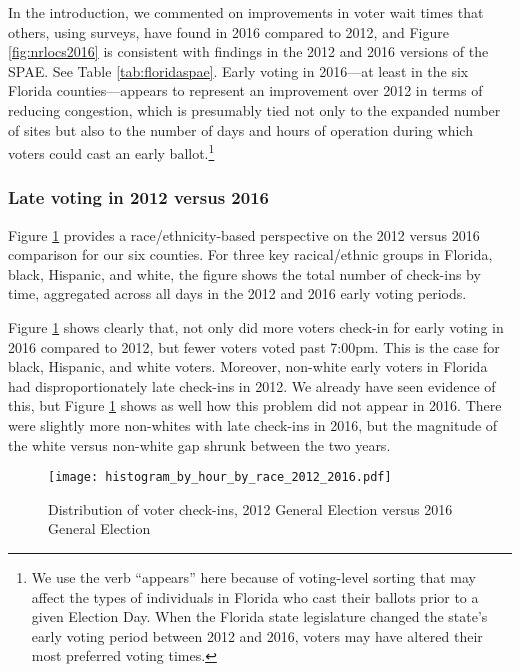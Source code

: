\documentclass[12pt,titlepage]{article}
\begin{document}
In the introduction, we commented on improvements in voter wait times
that others, using surveys, have found in 2016 compared to 2012, and
Figure \ref{fig:nrlocs2016} is consistent with findings in the 2012
\citep{spae2012} and 2016 \citep{spae2016} versions of the SPAE.  See
Table \ref{tab:floridaspae}.  Early voting in 2016---at least in the
six Florida counties---appears to represent an improvement over 2012
in terms of reducing congestion, which is presumably tied not only to
the expanded number of sites but also to the number of days and hours
of operation during which voters could cast an early
ballot.\footnote{We use the verb ``appears'' here because of
  voting-level sorting that may affect the types of individuals in
  Florida who cast their ballots prior to a given Election Day.  When
  the Florida state legislature changed the state's early voting
  period between 2012 and 2016, voters may have altered their most
  preferred voting times.}



\subsubsection*{Late voting in 2012 versus 2016}

Figure \ref{fig:race2012and2016} provides a race/ethnicity-based
perspective on the 2012 versus 2016 comparison for our six counties.
For three key racical/ethnic groups in Florida, black, Hispanic, and
white, the figure shows the total number of check-ins by time,
aggregated across all days in the 2012 and 2016 early voting periods.

Figure \ref{fig:race2012and2016} shows clearly that, not only did more
voters check-in for early voting in 2016 compared to 2012, but fewer
voters voted past 7:00pm.  This is the case for black, Hispanic, and
white voters. Moreover, non-white early voters in Florida had
disproportionately late check-ins in 2012.  We already have seen
evidence of this, but Figure \ref{fig:race2012and2016} shows as well
how this problem did not appear in 2016.  There were slightly more
non-whites with late check-ins in 2016, but the magnitude of the white
versus non-white gap shrunk between the two years.

\begin{figure}[!ht]
  \caption{Distribution of voter check-ins, 2012 General Election versus 2016 General Election}
  \label{fig:race2012and2016}
  \centering
  \centering\texttt{[image: histogram\_by\_hour\_by\_race\_2012\_2016.pdf]}
\end{figure}
\end{document}
